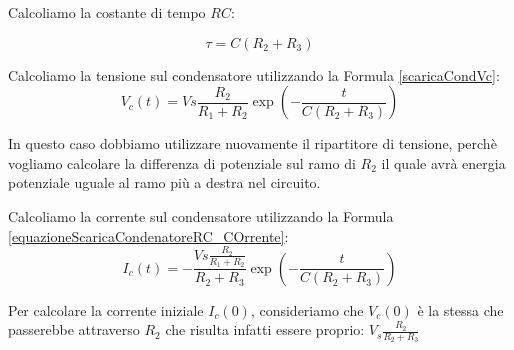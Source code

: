 Calcoliamo la costante di tempo $RC$:

\begin{equation*}
    \tau = C(R_2 + R_3)
\end{equation*}

Calcoliamo la tensione sul condensatore utilizzando la Formula \ref{scaricaCondVc}:
\begin{equation*}
    V_c(t) = Vs\frac{R_2}{R_1+R_2}\exp(-\frac{t}{C(R_2 + R_3)})
\end{equation*}

In questo caso dobbiamo utilizzare nuovamente il ripartitore di tensione, perchè vogliamo calcolare la differenza di potenziale sul ramo di $R_2$ il quale avrà energia potenziale uguale al ramo più a destra nel circuito.


Calcoliamo la corrente sul condensatore utilizzando la Formula \ref{equazioneScaricaCondenatoreRC_COrrente}:
\begin{equation*}
    I_c(t) = -\frac{Vs\frac{R_2}{R_1+R_2}}{R_2+R_3}\exp(-\frac{t}{C(R_2 + R_3)})
\end{equation*}

Per calcolare la corrente iniziale $I_c(0)$, consideriamo che $V_c(0)$ è la stessa che passerebbe attraverso $R_2$ che  risulta infatti essere proprio: $V_s\frac{R_2}{R_2+R_3}$


